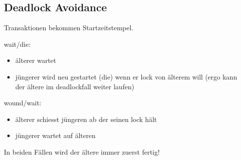 \documentclass[10pt,a4paper,oneside]{report}
\begin{document}
\subsection*{Deadlock Avoidance}

Transaktionen bekommen Startzeitstempel.

wait/die:

\begin{itemize}
\item älterer wartet
\item jüngerer wird neu gestartet (die) wenn er lock von älterem will (ergo kann der ältere im deadlockfall weiter laufen)
\end{itemize}

wound/wait:

\begin{itemize}
\item älterer schiesst jüngeren ab der seinen lock hält
\item jüngerer wartet auf älteren
\end{itemize}

In beiden Fällen wird der ältere immer zuerst fertig!
\end{document}

